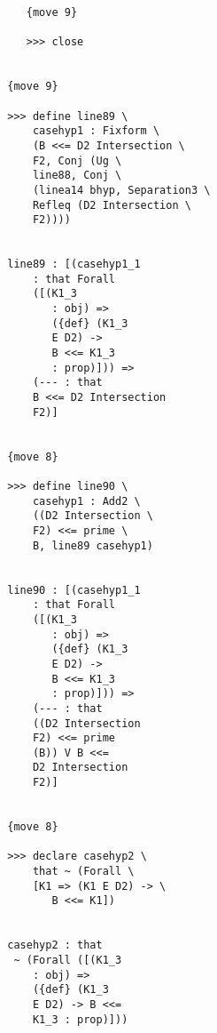 \documentclass[12pt]{article}
\begin{document}
\begin{verbatim}
                              {move 9}

                              >>> close


                           {move 9}

                           >>> define line89 \
                               casehyp1 : Fixform \
                               (B <<= D2 Intersection \
                               F2, Conj (Ug \
                               line88, Conj \
                               (linea14 bhyp, Separation3 \
                               Refleq (D2 Intersection \
                               F2))))


                           line89 : [(casehyp1_1 
                               : that Forall 
                               ([(K1_3 
                                  : obj) => 
                                  ({def} (K1_3 
                                  E D2) -> 
                                  B <<= K1_3 
                                  : prop)])) => 
                               (--- : that 
                               B <<= D2 Intersection 
                               F2)]


                           {move 8}

                           >>> define line90 \
                               casehyp1 : Add2 \
                               ((D2 Intersection \
                               F2) <<= prime \
                               B, line89 casehyp1)


                           line90 : [(casehyp1_1 
                               : that Forall 
                               ([(K1_3 
                                  : obj) => 
                                  ({def} (K1_3 
                                  E D2) -> 
                                  B <<= K1_3 
                                  : prop)])) => 
                               (--- : that 
                               ((D2 Intersection 
                               F2) <<= prime 
                               (B)) V B <<= 
                               D2 Intersection 
                               F2)]


                           {move 8}

                           >>> declare casehyp2 \
                               that ~ (Forall \
                               [K1 => (K1 E D2) -> \
                                  B <<= K1])


                           casehyp2 : that 
                            ~ (Forall ([(K1_3 
                               : obj) => 
                               ({def} (K1_3 
                               E D2) -> B <<= 
                               K1_3 : prop)]))



\end{verbatim}
\end{document}
